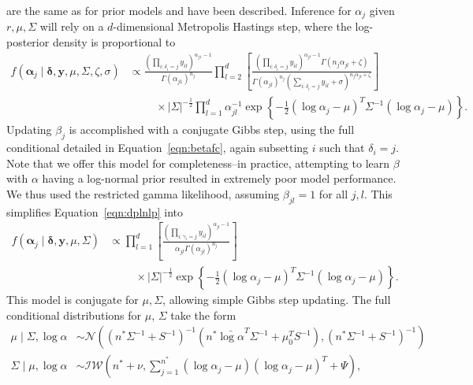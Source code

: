   are the same as for prior models and have been described.  Inference for $\alpha_j$ given
  $r, \mu,\Sigma$ will rely on a $d$-dimensional Metropolis Hastings step, where the log-posterior
  density is proportional to
  \begin{equation}
    \label{eqn:dplnlp}
    \begin{aligned}
    f(\bm{\alpha}_j\mid\bm{\delta},\bm{y},\mu,\Sigma,\zeta,\sigma) &\propto
    \frac{\left(\prod_{i:\delta_i = j}y_{il}\right)^{\alpha_{j1} - 1}}{\Gamma(\alpha_{j1})^{n_j}}
        \prod_{l = 2}^d\left[\frac{\left(\prod_{i:\delta_i = j}y_{il}\right)^{\alpha_{jl} - 1}
        \Gamma(n_j\alpha_{jl} + \zeta)}{\Gamma(\alpha_{jl})^{n_j}\left(\sum_{i:\delta_i = j}y_{il}
        + \sigma\right)^{n_j\alpha_{jl} + \zeta}}\right]\\
        &\hspace{1cm}\times
        \lvert \Sigma\rvert^{-\frac{1}{2}}\prod_{l=1}^d\alpha_{jl}^{-1}\exp\left\lbrace
          -\frac{1}{2}(\log\alpha_j - \mu)^T\Sigma^{-1}(\log\alpha_j - \mu)\right\rbrace.
    \end{aligned}
  \end{equation}
  Updating $\beta_j$ is accomplished with a conjugate Gibbs step, using the full conditional detailed
  in Equation~\ref{eqn:betafc}, again subsetting $i$ such that $\delta_i = j$.  Note that we offer this
  model for completeness--in practice, attempting to learn $\beta$ with $\alpha$ having a log-normal
  prior resulted in extremely poor model performance.  We thus used the restricted gamma likelihood,
  assuming $\beta_{jl} = 1$ for all $j,l$.  This simplifies Equation~\ref{eqn:dplnlp} into
  \begin{equation}
    \label{eqn:dplnlpr}
    \begin{aligned}
    f(\bm{\alpha}_j\mid\bm{\delta},\bm{y},\mu,\Sigma) &\propto
    \prod_{l = 1}^d\left[\frac{\left(\prod_{i:\gamma_i = j}y_{il}\right)^{\alpha_{jl} - 1}}{\alpha_{jl}\Gamma(\alpha_{jl})^{n_j}} \right]\\
      &\hspace{1cm}\times\lvert\Sigma\rvert^{-\frac{1}{2}}
      \exp\left\lbrace-\frac{1}{2}(\log\alpha_j - \mu)^T\Sigma^{-1}(\log\alpha_j - \mu)\right\rbrace.
    \end{aligned}
  \end{equation}
  This model is conjugate for $\mu,\Sigma$, allowing simple Gibbs step updating.  The full
    conditional distributions for $\mu$, $\Sigma$ take the form
  \begin{equation}
    \begin{aligned}
    \mu\mid\Sigma,\log\alpha &\sim \mathcal{N}\left((n^*\Sigma^{-1} + S^{-1})^{-1}(n^*\bar{\log\alpha}^T\Sigma^{-1}
      + \mu_0^TS^{-1}),(n^{*}\Sigma^{-1} + S^{-1})^{-1}\right)\\
    \Sigma\mid\mu,\log\alpha &\sim \mathcal{IW}\left(
        n^* + \nu, \sum_{j = 1}^{n^*}(\log\alpha_j - \mu)(\log\alpha_j - \mu)^T + \Psi\right),
    \end{aligned}
  \end{equation}
